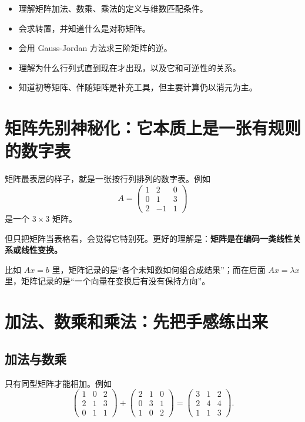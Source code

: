 \documentclass[11pt,oneside,UTF8]{ctexbook}
\newcommand{\important}[1]{\textcolor{Sakura}{\textbf{#1}}}
\begin{document}
\begin{goalbox}[这一章你要学会什么]
\begin{itemize}
  \item 理解矩阵加法、数乘、乘法的定义与维数匹配条件。
  \item 会求转置，并知道什么是对称矩阵。
  \item 会用 Gauss-Jordan 方法求三阶矩阵的逆。
  \item 理解为什么行列式直到现在才出现，以及它和可逆性的关系。
  \item 知道初等矩阵、伴随矩阵是补充工具，但主要计算仍以消元为主。
\end{itemize}
\end{goalbox}

\section{矩阵先别神秘化：它本质上是一张有规则的数字表}

矩阵最表层的样子，就是一张按行列排列的数字表。例如
\[
A=
\begin{pmatrix}
1&2&0\\
0&1&3\\
2&-1&1
\end{pmatrix}
\]
是一个 \(3\times 3\) 矩阵。

但只把矩阵当表格看，会觉得它特别死。更好的理解是：\important{矩阵是在编码一类线性关系或线性变换。}

比如 \(Ax=b\) 里，矩阵记录的是“各个未知数如何组合成结果”；而在后面 \(Ax=\lambda x\) 里，矩阵记录的是“一个向量在变换后有没有保持方向”。

\section{加法、数乘和乘法：先把手感练出来}

\subsection{加法与数乘}

只有同型矩阵才能相加。例如
\[
\begin{pmatrix}
1&0&2\\
2&1&3\\
0&1&1
\end{pmatrix}
+
\begin{pmatrix}
2&1&0\\
0&3&1\\
1&0&2
\end{pmatrix}
=
\begin{pmatrix}
3&1&2\\
2&4&4\\
1&1&3
\end{pmatrix}.
\]
\end{document}
